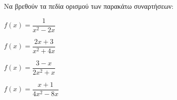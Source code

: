 Να βρεθούν τα πεδία ορισμού των παρακάτω συναρτήσεων:
\begin{alist}
\item $ f(x)=\dfrac{1}{x^2-2x} $
\item $ f(x)=\dfrac{2x+3}{x^2+4x} $
\item $ f(x)=\dfrac{3-x}{2x^2+x} $
\item $ f(x)=\dfrac{x+1}{4x^2-8x} $
\end{alist}
